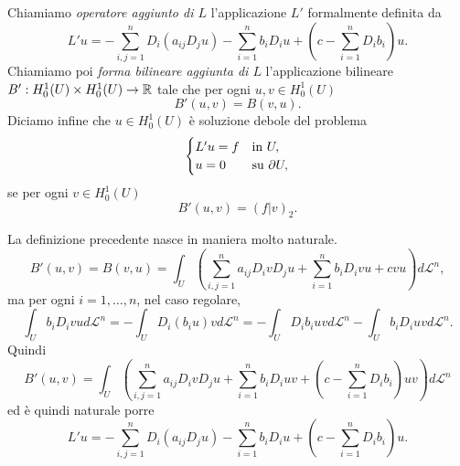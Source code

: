 \begin{definizione}
	Chiamiamo \emph{operatore aggiunto di $L$} l'applicazione $L'$ formalmente definita da
	\[ L'u = -\sum_{i,j=1}^{n}D_i\left( a_{ij}D_{j}u\right) -\sum_{i=1}^{n}b_i D_i u + \left( c-\sum_{i=1}^{n}D_ib_i\right)u.\]
	Chiamiamo poi \emph{forma bilineare aggiunta di $L$} l'applicazione bilineare $B':H^1_0(U)\times H^1_0(U) \to \mathbb{R}$ tale che per ogni $u,v \in H^1_0(U)$
	\[ B'(u,v) = B(v,u). \]
	Diciamo infine che $u \in H^1_0(U)$ è soluzione debole del problema
	\[ \begin{cases}
		L'u=f & \textup{in } U,\\
		u= 0 & \textup{su } \partial U,
	\end{cases} \]
	se per ogni $v \in H^1_0(U)$
	\[ B'(u,v) = (f|v)_2. \]
	
	\begin{osservazione}
		La definizione precedente nasce in maniera molto naturale.
		\[ B'(u,v) = B(v,u) = \int_U \left( \sum_{i,j=1}^{n}a_{ij}D_ivD_{j}u + \sum_{i=1}^{n}b_i D_ivu + cvu\right) d\mathcal{L}^n, \]
		ma per ogni $i = 1,\dots, n$, nel caso regolare,
		\[ \int_U b_i D_i v u d\mathcal{L}^n = -\int_U D_i(b_iu)v d\mathcal{L}^n =  -\int_U D_ib_i uv d\mathcal{L}^n -\int_U b_iD_iuv d\mathcal{L}^n.  \]
		Quindi
		\[ B'(u,v) = \int_U \left( \sum_{i,j=1}^{n}a_{ij}D_ivD_{j}u + \sum_{i=1}^{n}b_i D_iuv + (c- \sum_{i=1}^nD_ib_i)uv\right) d\mathcal{L}^n \]
		ed è quindi naturale porre
		\[ L'u = -\sum_{i,j=1}^{n}D_i\left( a_{ij}D_{j}u\right) -\sum_{i=1}^{n}b_i D_i u + \left( c-\sum_{i=1}^{n}D_ib_i\right)u.\]
	\end{osservazione}
	
\end{definizione}
